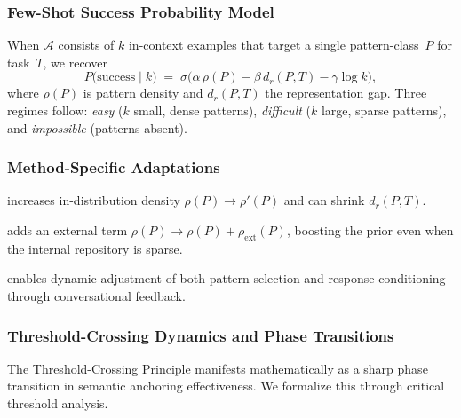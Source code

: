 \subsubsection{Few-Shot Success Probability Model}
\label{sec:core_model}
When $\mathcal{A}$ consists of $k$ in-context examples that target a single
pattern-class~$P$ for task~$T$, we recover
\begin{equation}
\label{eq:ucct-logistic}
P\!\bigl(\mathrm{success}\mid k\bigr)
\;=\;
\sigma\!\bigl(
  \alpha\,\rho(P) - \beta\,d_r(P,T) - \gamma\log k
\bigr),
\end{equation}
where $\rho(P)$ is pattern density and $d_r(P,T)$ the representation gap.
Three regimes follow: \emph{easy} ($k$ small, dense patterns),
\emph{difficult} ($k$ large, sparse patterns), and
\emph{impossible} (patterns absent).

\subsubsection{Method-Specific Adaptations}
\label{sec:method_adaptations}
\begin{description}[leftmargin=1.4em,itemsep=1pt]
  \item[Fine-tuning:] increases in-distribution density
        $\rho(P)\!\rightarrow\!\rho'(P)$ and can shrink $d_r(P,T)$.
  \item[RAG:] adds an external term
        $\rho(P)\!\rightarrow\!\rho(P)+\rho_{\text{ext}}(P)$,
        boosting the prior even when the internal repository is sparse.
  \item[Interactive anchoring:] enables dynamic adjustment of both
        pattern selection and response conditioning through conversational feedback.
\end{description}

\subsubsection{Threshold-Crossing Dynamics and Phase Transitions}
\label{sec:threshold_crossing}
The Threshold-Crossing Principle manifests mathematically as a sharp phase transition in semantic anchoring effectiveness. We formalize this through critical threshold analysis.


